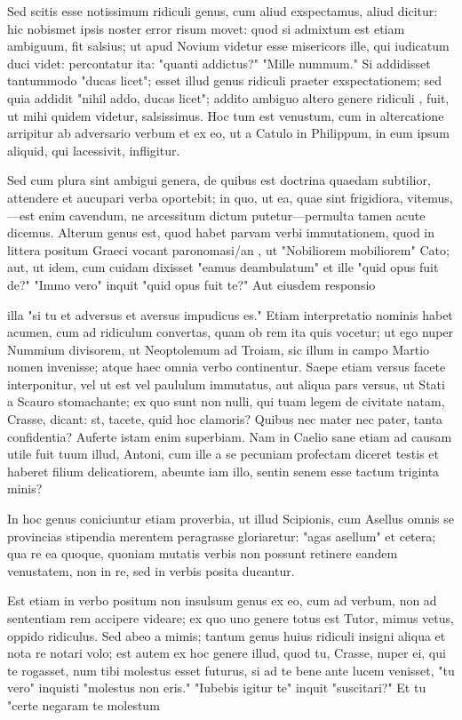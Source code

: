  Sed scitis esse notissimum ridiculi genus, cum aliud exspectamus, aliud dicitur: hic nobismet ipsis noster error risum movet: quod si admixtum est etiam ambiguum, fit salsius; ut apud Novium videtur esse misericors ille, qui iudicatum duci videt: percontatur ita: "quanti addictus?" "Mille nummum." Si addidisset tantummodo "ducas licet"; esset illud genus ridiculi praeter exspectationem; sed quia addidit "nihil addo, ducas licet"; addito ambiguo altero genere ridiculi , fuit, ut mihi quidem videtur, salsissimus. Hoc tum est venustum, cum in altercatione arripitur ab adversario verbum et ex eo, ut a Catulo in Philippum, in eum ipsum aliquid, qui lacessivit, infligitur.

 Sed cum plura sint ambigui genera, de quibus est doctrina quaedam subtilior, attendere et aucupari verba oportebit; in quo, ut ea, quae sint frigidiora, vitemus,—est enim cavendum, ne arcessitum dictum putetur—permulta tamen acute dicemus. Alterum genus est, quod habet parvam verbi immutationem, quod in littera positum Graeci vocant paronomasi/an , ut "Nobiliorem mobiliorem" Cato; aut, ut idem, cum cuidam dixisset "eamus deambulatum" et ille "quid opus fuit de?" "Immo vero" inquit "quid opus fuit te?" Aut eiusdem responsio

 illa "si tu et adversus et aversus impudicus es." Etiam interpretatio nominis habet acumen, cum ad ridiculum convertas, quam ob rem ita quis vocetur; ut ego nuper Nummium divisorem, ut Neoptolemum ad Troiam, sic illum in campo Martio nomen invenisse; atque haec omnia verbo continentur. Saepe etiam versus facete interponitur, vel ut est vel paululum immutatus, aut aliqua pars versus, ut Stati a Scauro stomachante; ex quo sunt non nulli, qui tuam legem de civitate natam, Crasse, dicant: st, tacete, quid hoc clamoris? Quibus nec mater nec pater, tanta confidentia? Auferte istam enim superbiam. Nam in Caelio sane etiam ad causam utile fuit tuum illud, Antoni, cum ille a se pecuniam profectam diceret testis et haberet filium delicatiorem, abeunte iam illo, sentin senem esse tactum triginta minis?

 In hoc genus coniciuntur etiam proverbia, ut illud Scipionis, cum Asellus omnis se provincias stipendia merentem peragrasse gloriaretur: "agas asellum" et cetera; qua re ea quoque, quoniam mutatis verbis non possunt retinere eandem venustatem, non in re, sed in verbis posita ducantur.

 Est etiam in verbo positum non insulsum genus ex eo, cum ad verbum, non ad sententiam rem accipere videare; ex quo uno genere totus est Tutor, mimus vetus, oppido ridiculus. Sed abeo a mimis; tantum genus huius ridiculi insigni aliqua et nota re notari volo; est autem ex hoc genere illud, quod tu, Crasse, nuper ei, qui te rogasset, num tibi molestus esset futurus, si ad te bene ante lucem venisset, "tu vero" inquisti "molestus non eris." "Iubebis igitur te" inquit "suscitari?" Et tu "certe negaram te molestum

